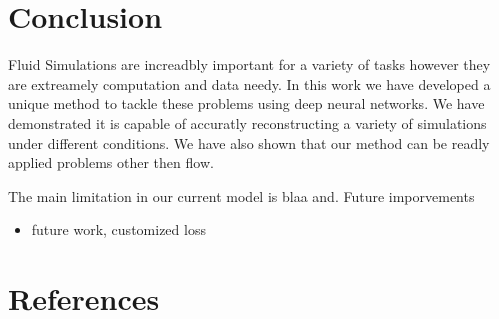 \documentclass{article}
\begin{document}
\section{Conclusion}

Fluid Simulations are increadbly important for a variety of tasks however they are extreamely computation and data needy. In this work we have developed a unique method to tackle these problems using deep neural networks. We have demonstrated it is capable of accuratly reconstructing a variety of simulations under different conditions. We have also shown that our method can be readly applied problems other then flow.

The main limitation in our current model is blaa and. Future imporvements 

\begin{itemize}
  \item future work, customized loss
\end{itemize}

\section*{References}



\end{document}
